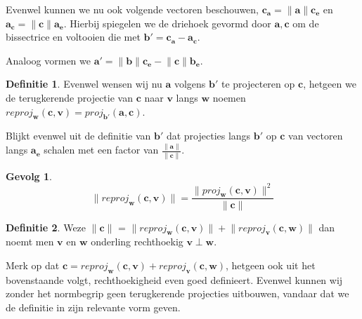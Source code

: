 \documentclass{amsart}
\theoremstyle{definition}
\newtheorem{dfn}{Definitie}[section]
\newtheorem{csq}{Gevolg}[section]
\newcommand{\norm}[1]{\lVert{#1}\rVert}
\newcommand{\vvec}[1][v]{\mathbf{#1}}
\newcommand{\uvec}[1][v]{\vvec[#1]_\mathbf{e}}
\newcommand{\vnorm}[1]{\norm{\vvec[#1]}}
\begin{document}
Evenwel kunnen we nu ook volgende vectoren beschouwen, $\vvec[c_a] = \vnorm a \uvec[c]$ en $\vvec[a_c] = \vnorm c \uvec[a]$.
Hierbij spiegelen we de driehoek gevormd door $\vvec[a], \vvec[c]$ om de bissectrice en voltooien die met $\vvec[b'] = \vvec[c_a] - \vvec[a_c]$.

Analoog vormen we $\vvec[a'] = \vnorm b\uvec[c] - \vnorm c\uvec[b]$.

\begin{dfn}
    Evenwel wensen wij nu $\vvec[a]$ volgens $\vvec[b']$ te projecteren op $\vvec[c]$, hetgeen we de terugkerende projectie van $\vvec[c]$ naar $\vvec$ langs $\vvec[w]$ noemen $reproj_{\vvec[w]}(\vvec[c], \vvec) = proj_{\vvec[b']}(\vvec[a], \vvec[c])$.
\end{dfn}

Blijkt evenwel uit de definitie van $\vvec[b']$ dat projecties langs $\vvec[b']$ op $\vvec[c]$ van vectoren langs $\uvec[a]$ schalen met een factor van $\frac{\vnorm a}{\vnorm c}$.

\begin{csq}
    \begin{equation*}
        \norm{reproj_{\vvec[w]}(\vvec[c], \vvec)} = \frac{\norm{proj_{\vvec[w]}(\vvec[c], \vvec)}^2}{\vnorm c}
    \end{equation*}
\end{csq}

\begin{dfn}
    Weze $\vnorm c$ = $\norm{reproj_{\vvec[w]}(\vvec[c], \vvec)} + \norm{reproj_{\vvec}(\vvec[c], \vvec[w])}$ dan noemt men $\vvec$ en $\vvec[w]$ onderling rechthoekig $\vvec \perp \vvec[w]$.
\end{dfn}

Merk op dat $\vvec[c] = reproj_{\vvec[w]}(\vvec[c], \vvec) + reproj_{\vvec}(\vvec[c], \vvec[w])$, hetgeen ook uit het bovenstaande volgt, rechthoekigheid even goed definieert.
Evenwel kunnen wij zonder het normbegrip geen terugkerende projecties uitbouwen, vandaar dat we de definitie in zijn relevante vorm geven.
\end{document}
